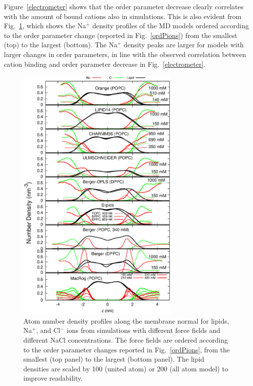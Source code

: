 \documentclass[twoside,twocolumn,9pt]{article}
\begin{document}
Figure~\ref{electrometer} shows that the order parameter decrease clearly correlates with the
amount of bound cations also in simulations. This is also evident from Fig.~\ref{NAdensities},
which shows the Na$^+$ density profiles of the MD models
ordered according to the order parameter change 
(reported in Fig.~\ref{ordPions}) from the smallest (top) to the largest (bottom).
The Na$^+$ density peaks are larger for models with larger changes in order parameters,
in line with the observed correlation between cation binding and order parameter decrease in
Fig.~\ref{electrometer}.
\begin{figure}[t]
  \centering
  \includegraphics[width=8cm]{../Fig/NAdensities.eps}
  \caption{\label{NAdensities}
    Atom number density profiles along the membrane normal for lipids, Na$^+$, and Cl$^-$ ions 
    from simulations with different force fields and different NaCl concentrations. 
    The force fields are ordered according to the order parameter changes 
    reported in Fig.~\ref{ordPions}, from the smallest (top panel) to the largest (bottom panel).
    The lipid densities are scaled by 100 (united atom) or 200 (all atom model) to improve readability. 
}
\end{figure}
\end{document}
